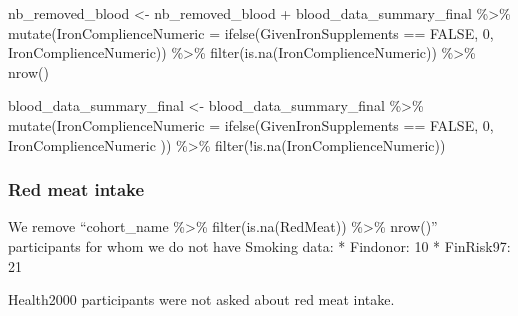 \documentclass[
]{article}
\newenvironment{Shaded}{\begin{snugshade}}{\end{snugshade}}
\newcommand{\AttributeTok}[1]{\textcolor[rgb]{0.77,0.63,0.00}{#1}}
\newcommand{\ConstantTok}[1]{\textcolor[rgb]{0.00,0.00,0.00}{#1}}
\newcommand{\DecValTok}[1]{\textcolor[rgb]{0.00,0.00,0.81}{#1}}
\newcommand{\FunctionTok}[1]{\textcolor[rgb]{0.00,0.00,0.00}{#1}}
\newcommand{\NormalTok}[1]{#1}
\newcommand{\OtherTok}[1]{\textcolor[rgb]{0.56,0.35,0.01}{#1}}
\newcommand{\SpecialCharTok}[1]{\textcolor[rgb]{0.00,0.00,0.00}{#1}}
\begin{document}
\begin{Shaded}
\begin{Highlighting}[]
\NormalTok{nb\_removed\_blood }\OtherTok{\textless{}{-}}\NormalTok{ nb\_removed\_blood }\SpecialCharTok{+}
\NormalTok{                            blood\_data\_summary\_final }\SpecialCharTok{\%\textgreater{}\%} 
                              \FunctionTok{mutate}\NormalTok{(}\AttributeTok{IronComplienceNumeric =} \FunctionTok{ifelse}\NormalTok{(GivenIronSupplements }\SpecialCharTok{==} \ConstantTok{FALSE}\NormalTok{, }\DecValTok{0}\NormalTok{, IronComplienceNumeric)) }\SpecialCharTok{\%\textgreater{}\%} 
                              \FunctionTok{filter}\NormalTok{(}\FunctionTok{is.na}\NormalTok{(IronComplienceNumeric)) }\SpecialCharTok{\%\textgreater{}\%} 
                              \FunctionTok{nrow}\NormalTok{() }

\NormalTok{blood\_data\_summary\_final }\OtherTok{\textless{}{-}}\NormalTok{ blood\_data\_summary\_final }\SpecialCharTok{\%\textgreater{}\%} 
  \FunctionTok{mutate}\NormalTok{(}\AttributeTok{IronComplienceNumeric =} \FunctionTok{ifelse}\NormalTok{(GivenIronSupplements }\SpecialCharTok{==} \ConstantTok{FALSE}\NormalTok{, }\DecValTok{0}\NormalTok{, IronComplienceNumeric )) }\SpecialCharTok{\%\textgreater{}\%} 
  \FunctionTok{filter}\NormalTok{(}\SpecialCharTok{!}\FunctionTok{is.na}\NormalTok{(IronComplienceNumeric))}
\end{Highlighting}
\end{Shaded}

\hypertarget{red-meat-intake}{%
\subsubsection{Red meat intake}\label{red-meat-intake}}

We remove ``cohort\_name \%\textgreater\% filter(is.na(RedMeat))
\%\textgreater\% nrow()'' participants for whom we do not have Smoking
data: * Findonor: 10 * FinRisk97: 21

Health2000 participants were not asked about red meat intake.
\end{document}
